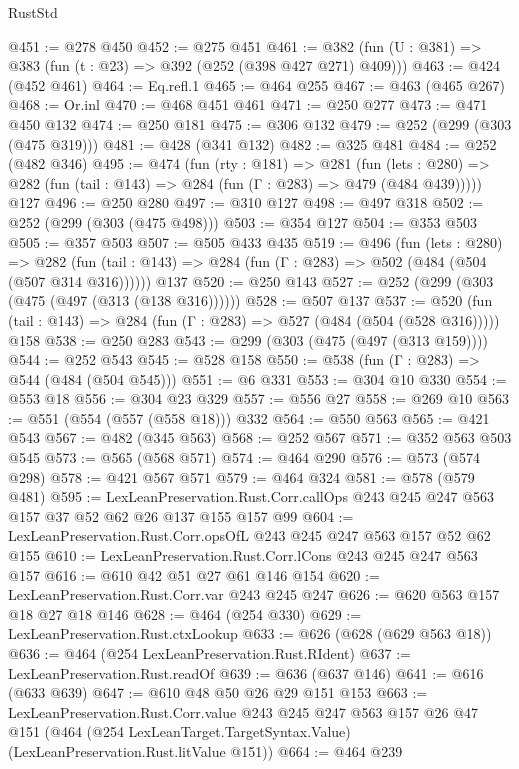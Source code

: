 \begin{lexlean}{RustStd}
\begin{coremodule}
@451 := @278 @450
@452 := @275 @451
@461 := @382 (fun (U : @381) => @383 (fun (t : @23) => @392 (@252 (@398 @427 @271) @409)))
@463 := @424 (@452 @461)
@464 := Eq.refl.{1}
@465 := @464 @255
@467 := @463 (@465 @267)
@468 := Or.inl
@470 := @468 @451 @461
@471 := @250 @277
@473 := @471 @450 @132
@474 := @250 @181
@475 := @306 @132
@479 := @252 (@299 (@303 (@475 @319)))
@481 := @428 (@341 @132)
@482 := @325 @481
@484 := @252 (@482 @346)
@495 := @474
    (fun (rty : @181) =>
    @281
      (fun (lets : @280) => @282 (fun (tail : @143) => @284 (fun (Γ : @283) => @479 (@484 @439)))))
    @127
@496 := @250 @280
@497 := @310 @127
@498 := @497 @318
@502 := @252 (@299 (@303 (@475 @498)))
@503 := @354 @127
@504 := @353 @503
@505 := @357 @503
@507 := @505 @433 @435
@519 := @496
    (fun (lets : @280) =>
    @282 (fun (tail : @143) => @284 (fun (Γ : @283) => @502 (@484 (@504 (@507 @314 @316))))))
    @137
@520 := @250 @143
@527 := @252 (@299 (@303 (@475 (@497 (@313 (@138 @316))))))
@528 := @507 @137
@537 := @520 (fun (tail : @143) => @284 (fun (Γ : @283) => @527 (@484 (@504 (@528 @316))))) @158
@538 := @250 @283
@543 := @299 (@303 (@475 (@497 (@313 @159))))
@544 := @252 @543
@545 := @528 @158
@550 := @538 (fun (Γ : @283) => @544 (@484 (@504 @545)))
@551 := @6 @331
@553 := @304 @10 @330
@554 := @553 @18
@556 := @304 @23 @329
@557 := @556 @27
@558 := @269 @10
@563 := @551 (@554 (@557 (@558 @18))) @332
@564 := @550 @563
@565 := @421 @543
@567 := @482 (@345 @563)
@568 := @252 @567
@571 := @352 @563 @503 @545
@573 := @565 (@568 @571)
@574 := @464 @290
@576 := @573 (@574 @298)
@578 := @421 @567 @571
@579 := @464 @324
@581 := @578 (@579 @481)
@595 := LexLeanPreservation.Rust.Corr.callOps
    @243
    @245
    @247
    @563
    @157
    @37
    @52
    @62
    @26
    @137
    @155
    @157
    @99
@604 := LexLeanPreservation.Rust.Corr.opsOfL @243 @245 @247 @563 @157 @52 @62 @155
@610 := LexLeanPreservation.Rust.Corr.lCons @243 @245 @247 @563 @157
@616 := @610 @42 @51 @27 @61 @146 @154
@620 := LexLeanPreservation.Rust.Corr.var @243 @245 @247
@626 := @620 @563 @157 @18 @27 @18 @146
@628 := @464 (@254 @330)
@629 := LexLeanPreservation.Rust.ctxLookup
@633 := @626 (@628 (@629 @563 @18))
@636 := @464 (@254 LexLeanPreservation.Rust.RIdent)
@637 := LexLeanPreservation.Rust.readOf
@639 := @636 (@637 @146)
@641 := @616 (@633 @639)
@647 := @610 @48 @50 @26 @29 @151 @153
@663 := LexLeanPreservation.Rust.Corr.value
    @243
    @245
    @247
    @563
    @157
    @26
    @47
    @151
    (@464 (@254 LexLeanTarget.TargetSyntax.Value) (LexLeanPreservation.Rust.litValue @151))
@664 := @464 @239

\end{coremodule}
\end{lexlean}
